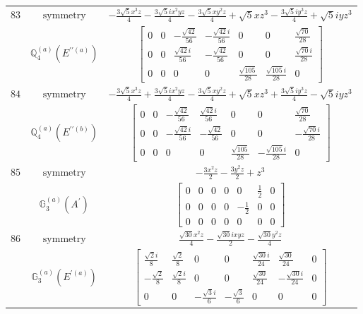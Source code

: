 \documentclass[fleqn,8pt,landscape]{jsarticle}
\begin{document}
\begin{longtable}{ccc}
$ 83 $ & $ \text{symmetry} $ & $ - \frac{3 \sqrt{5} x^{3} z}{4} - \frac{3 \sqrt{5} i x^{2} y z}{4} - \frac{3 \sqrt{5} x y^{2} z}{4} + \sqrt{5} x z^{3} - \frac{3 \sqrt{5} i y^{3} z}{4} + \sqrt{5} i y z^{3} $ \\
$  $ & $ \mathbb{Q}_{4}^{(a)}(E^{\prime\prime(a)}) $ & $ \begin{bmatrix} 0 & 0 & - \frac{\sqrt{42}}{56} & - \frac{\sqrt{42} i}{56} & 0 & 0 & \frac{\sqrt{70}}{28} \\ 0 & 0 & \frac{\sqrt{42} i}{56} & - \frac{\sqrt{42}}{56} & 0 & 0 & \frac{\sqrt{70} i}{28} \\ 0 & 0 & 0 & 0 & \frac{\sqrt{105}}{28} & \frac{\sqrt{105} i}{28} & 0 \end{bmatrix} $ \\ \hline
$ 84 $ & $ \text{symmetry} $ & $ - \frac{3 \sqrt{5} x^{3} z}{4} + \frac{3 \sqrt{5} i x^{2} y z}{4} - \frac{3 \sqrt{5} x y^{2} z}{4} + \sqrt{5} x z^{3} + \frac{3 \sqrt{5} i y^{3} z}{4} - \sqrt{5} i y z^{3} $ \\
$  $ & $ \mathbb{Q}_{4}^{(a)}(E^{\prime\prime(b)}) $ & $ \begin{bmatrix} 0 & 0 & - \frac{\sqrt{42}}{56} & \frac{\sqrt{42} i}{56} & 0 & 0 & \frac{\sqrt{70}}{28} \\ 0 & 0 & - \frac{\sqrt{42} i}{56} & - \frac{\sqrt{42}}{56} & 0 & 0 & - \frac{\sqrt{70} i}{28} \\ 0 & 0 & 0 & 0 & \frac{\sqrt{105}}{28} & - \frac{\sqrt{105} i}{28} & 0 \end{bmatrix} $ \\ \hline
$ 85 $ & $ \text{symmetry} $ & $ - \frac{3 x^{2} z}{2} - \frac{3 y^{2} z}{2} + z^{3} $ \\
$  $ & $ \mathbb{G}_{3}^{(a)}(A^{\prime}) $ & $ \begin{bmatrix} 0 & 0 & 0 & 0 & 0 & \frac{1}{2} & 0 \\ 0 & 0 & 0 & 0 & - \frac{1}{2} & 0 & 0 \\ 0 & 0 & 0 & 0 & 0 & 0 & 0 \end{bmatrix} $ \\ \hline
$ 86 $ & $ \text{symmetry} $ & $ \frac{\sqrt{30} x^{2} z}{4} - \frac{\sqrt{30} i x y z}{2} - \frac{\sqrt{30} y^{2} z}{4} $ \\
$  $ & $ \mathbb{G}_{3}^{(a)}(E^{\prime(a)}) $ & $ \begin{bmatrix} \frac{\sqrt{2} i}{8} & \frac{\sqrt{2}}{8} & 0 & 0 & \frac{\sqrt{30} i}{24} & \frac{\sqrt{30}}{24} & 0 \\ - \frac{\sqrt{2}}{8} & \frac{\sqrt{2} i}{8} & 0 & 0 & \frac{\sqrt{30}}{24} & - \frac{\sqrt{30} i}{24} & 0 \\ 0 & 0 & - \frac{\sqrt{3} i}{6} & - \frac{\sqrt{3}}{6} & 0 & 0 & 0 \end{bmatrix} $ \\ \hline

\end{longtable}
\end{document}

